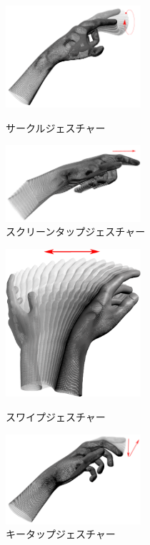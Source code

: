 \documentclass{funthesis}
\begin{document}
\begin{figure}[H]
 \begin{minipage}{0.5\hsize}
  \begin{center}
  \includegraphics[width=50mm]{./img/Circle.png}
  \end{center}
  \caption{サークルジェスチャー}
  \label{circle}
 \end{minipage}
 \begin{minipage}{0.5\hsize}
  \begin{center}
  \includegraphics[width=50mm]{./img/ScTap.png}
  \end{center}
  \caption{スクリーンタップジェスチャー}
  \label{sctap}
  \end{minipage}
\end{figure}

\begin{figure}[H]
 \begin{minipage}{0.5\hsize}
  \begin{center}
  \includegraphics[width=50mm]{./img/Swipe.png}
  \end{center}
  \caption{スワイプジェスチャー}
  \label{swipe}
 \end{minipage}
 \begin{minipage}{0.5\hsize}
  \begin{center}
  \includegraphics[width=50mm]{./img/KeyTap.png}
  \end{center}
  \caption{キータップジェスチャー}
  \label{keytap}
 \end{minipage}
\end{figure}
\end{document}
